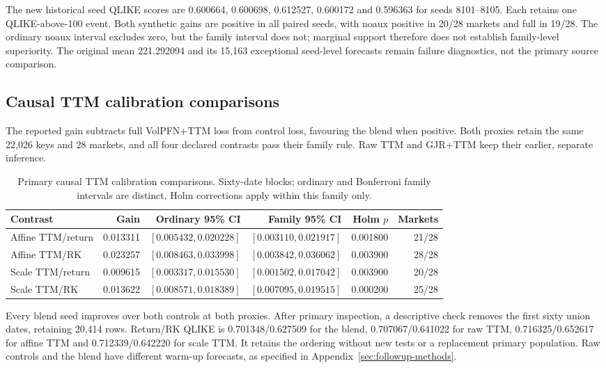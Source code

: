 The new historical seed QLIKE scores are 0.600664, 0.600698, 0.612527, 0.600172 and 0.596363 for seeds 8101--8105. Each retains one QLIKE-above-100 event. Both synthetic gains are positive in all paired seeds, with noaux positive in 20/28 markets and full in 19/28. The ordinary noaux interval excludes zero, but the family interval does not; marginal support therefore does not establish family-level superiority. The original mean 221.292094 and its 15,163 exceptional seed-level forecasts remain failure diagnostics, not the primary source comparison.

\FloatBarrier

\subsection{Causal TTM calibration comparisons}

The reported gain subtracts full VolPFN+TTM loss from control loss, favouring the blend when positive. Both proxies retain the same 22,026 keys and 28 markets, and all four declared contrasts pass their family rule. Raw TTM and GJR+TTM keep their earlier, separate inference.

\begin{table}[!htbp]\centering\footnotesize
\setlength{\tabcolsep}{3pt}
\caption[Causal TTM calibration comparisons intervals]{Primary causal TTM calibration comparisons. Sixty-date blocks; ordinary and Bonferroni family intervals are distinct. Holm corrections apply within this family only.}
\label{tab:followup-inference-1}
\begin{tabular}{lrrrrr}
\toprule Contrast & Gain & Ordinary 95\% CI & Family 95\% CI & Holm $p$ & Markets \\
\midrule
Affine TTM/return & 0.013311 & $[0.005432,0.020228]$ & $[0.003110,0.021917]$ & 0.001800 & 21/28 \\
Affine TTM/RK & 0.023257 & $[0.008463,0.033998]$ & $[0.003842,0.036062]$ & 0.003900 & 28/28 \\
Scale TTM/return & 0.009615 & $[0.003317,0.015530]$ & $[0.001502,0.017042]$ & 0.003900 & 20/28 \\
Scale TTM/RK & 0.013622 & $[0.008571,0.018389]$ & $[0.007095,0.019515]$ & 0.000200 & 25/28 \\
\bottomrule\end{tabular}\end{table}

Every blend seed improves over both controls at both proxies. After primary inspection, a descriptive check removes the first sixty union dates, retaining 20,414 rows. Return/RK QLIKE is 0.701348/0.627509 for the blend, 0.707067/0.641022 for raw TTM, 0.716325/0.652617 for affine TTM and 0.712339/0.642220 for scale TTM. It retains the ordering without new tests or a replacement primary population. Raw controls and the blend have different warm-up forecasts, as specified in Appendix~\ref{sec:followup-methods}.

